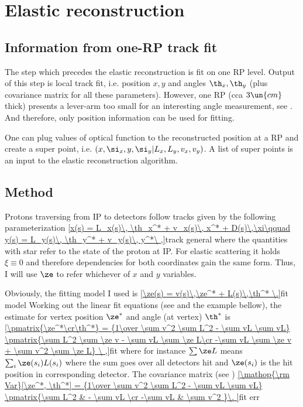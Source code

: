 \vfil\eject
\section{Elastic reconstruction}

\subsection{Information from one-RP track fit}

The step which precedes the elastic reconstruction is fit on one RP level. Output of this step is local track fit, i.e. position $x, y$ and angles $\th_x, \th_y$ (plus covariance matrix for all these parameters). However, one RP (cca $3\un{cm}$ thick) presents a lever-arm too small for an interesting angle measurement, see . And therefore, only position information can be used for fitting.

One can plug values of optical function to the reconstructed position at a RP and create a super point, i.e. $(x, \si_x, y, \si_y|L_x, L_y, v_x, v_y)$. A list of super points is an input to the elastic reconstruction algorithm.




\subsection{Method}

Protons traversing from IP to detectors follow tracks given by the following parameterization 
\eqref{x(s) = L_x(s)\, \th_x^* + v_x(s)\, x^* + D(s)\,\xi\qquad y(s) = L_y(s)\, \th_y^* + v_y(s)\, y^*\ ,}{track general}
where the quantities with star refer to the state of the proton at IP. For elastic scattering it holds $\xi\equiv 0$ and therefore dependencies for both coordinates gain the same form. Thus, I will use $\ze$ to refer whichever of $x$ and $y$ variables.

Obviously, the fitting model I used is
\eqref{\ze(s) = v(s)\,\ze^* + L(s)\,\th^* \.}{fit model}
Working out the linear fit equations (see  and the example bellow), the estimate for vertex position $\ze^*$ and angle (at vertex) $\th^*$ is
\eqref{\pmatrix{\ze^*\cr\th^*} = {1\over \sum v^2 \sum L^2 - \sum vL \sum vL} \pmatrix{\sum L^2 \sum \ze v - \sum vL \sum \ze L\cr -\sum vL \sum \ze v + \sum v^2 \sum \ze L} \ ,}{fit}
where for instance $\sum \ze L$ means $\sum_{i} \ze(s_i) L(s_i)$ where the sum goes over all detectors hit and $\ze(s_i)$ is the hit position in corresponding detector. The covariance matrix (see )
\eqref{\mathop{\rm Var}[\ze^*, \th^*] = {1\over \sum v^2 \sum L^2 - \sum vL \sum vL} \pmatrix{\sum L^2 & - \sum vL \cr -\sum vL & \sum v^2 }\.
}{fit err}

